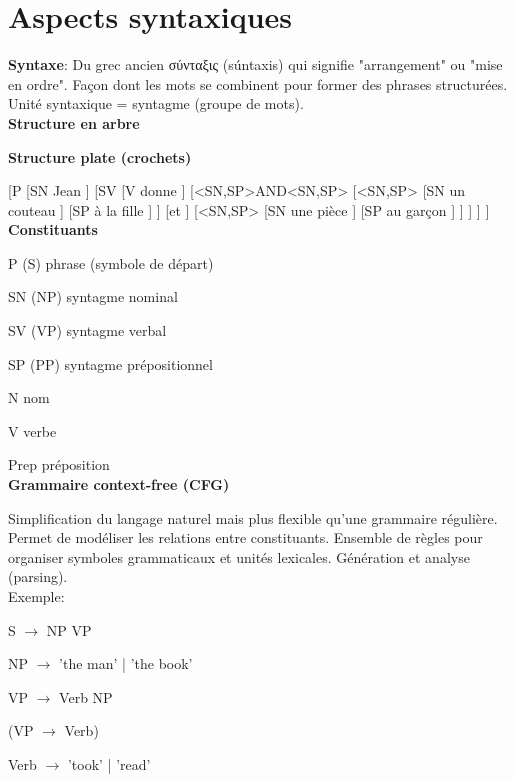 \vspace{-1.2cm}

\section{Aspects syntaxiques}

\textbf{Syntaxe}: Du grec ancien \textgreek{σύνταξις} (súntaxis) qui signifie "arrangement" ou "mise en ordre". Façon dont les mots se combinent pour former des phrases structurées. Unité syntaxique = syntagme (groupe de mots).\\

\textbf{Structure en arbre}

\begin{center}
\resizebox{0.6\textwidth}{!}{
    
}
\end{center}

\textbf{Structure plate (crochets)}

[P [SN Jean ] [SV [V donne ] [<SN,SP>AND<SN,SP> [<SN,SP> [SN un couteau ] [SP à la fille ] ] [et ] [<SN,SP> [SN une pièce ] [SP au garçon ] ] ] ] ] \\

\textbf{Constituants}

P (S) phrase (symbole de départ)

SN (NP) syntagme nominal

SV (VP) syntagme verbal

SP (PP) syntagme prépositionnel

N nom

V verbe

Prep préposition\\

\textbf{Grammaire context-free (CFG)}

Simplification du langage naturel mais plus flexible qu'une grammaire régulière. Permet de modéliser les relations entre constituants. Ensemble de règles pour organiser symboles grammaticaux et unités lexicales. Génération et analyse (parsing).\\

Exemple:

S $\rightarrow$ NP VP

NP $\rightarrow$ 'the man' | 'the book'

VP $\rightarrow$ Verb NP

(VP $\rightarrow$ Verb)

Verb $\rightarrow$ 'took' | 'read' \\


